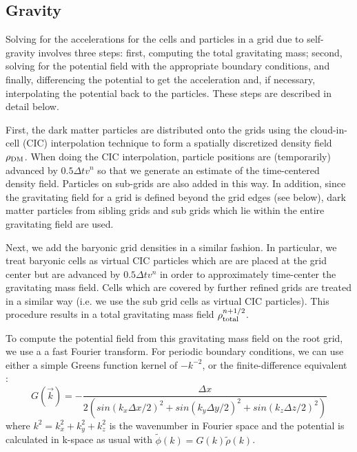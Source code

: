 \subsection{Gravity}
\label{sec.gravity}

Solving for the accelerations for the cells and particles in a grid due to self-gravity involves three steps: first, computing the total gravitating mass; second, solving for the potential field with the appropriate boundary conditions, and finally, differencing the potential to get the acceleration and, if necessary, interpolating the potential back to the particles. These steps are described in detail below.

First, the dark matter particles are distributed onto the grids using the cloud-in-cell (CIC) interpolation technique \citet{Hockney88} to form a spatially discretized density field $\rho_{\rm DM}$.  When doing the CIC interpolation, particle positions are (temporarily) advanced by $0.5 \Delta t v^n$ so that we generate an estimate of the time-centered density field.  Particles on sub-grids are also added in this way.  In addition, since the gravitating field for a grid is defined beyond the grid edges (see below), dark matter particles from sibling grids and sub grids which lie within the entire gravitating field are used.

Next, we add the baryonic grid densities in a similar fashion.  In particular, we treat baryonic cells as virtual CIC particles which are are placed at the grid center but are advanced by $0.5 \Delta t v^n$ in order to approximately time-center the gravitating mass field.  Cells which are covered by further refined grids are treated in a similar way (i.e. we use the sub grid cells as virtual CIC particles).  This procedure results in a total gravitating mass field $\rho_{\rm total}^{n+1/2}$.

To compute the potential field from this gravitating mass field on the root grid, we use a a fast Fourier transform. For periodic boundary conditions, we can use either a simple Greens function kernel of $-k^{-2}$, or the finite-difference equivalent \citep{Hockney88}:
\begin{equation}
G(\vec{k}) = - \frac{\Delta x}{2 \left( sin(k_x \Delta x/2)^2 + sin(k_y \Delta y/2)^2 + sin(k_z \Delta z/2)^2 \right) }
\end{equation}
where $k^2 = k_x^2 + k_y^2 + k_z^2$ is the wavenumber in Fourier space and the potential is calculated in k-space as usual with $\tilde{\phi}(k) = G(k) \tilde{\rho}(k)$.  

